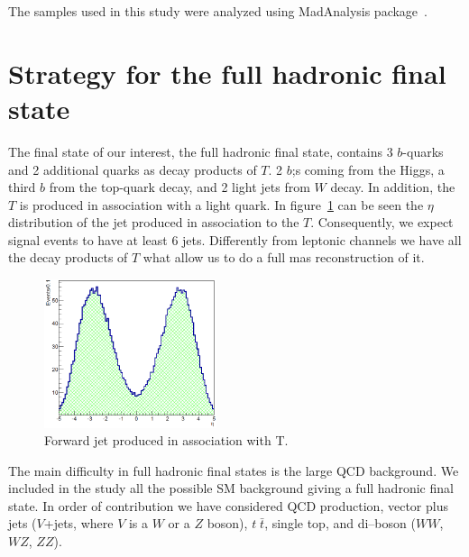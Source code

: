 The samples used in this study were analyzed using MadAnalysis package~\cite{Conte:2012fm, Conte:2014zja}.

\section{Strategy for the full hadronic final state}
\label{sec:Pstra}

The final state of our interest, the full hadronic final state, contains 3 $b$-quarks and 2 additional quarks as decay products of $T$. 2 $b$;s coming from the Higgs, a third $b$ from the top-quark decay, and 2 light jets from $W$ decay. In addition, the $T$ is produced in association with a light quark. In figure~\ref{fig:ForwJ} can be seen the $\eta$ distribution of the jet produced in association to the $T$. Consequently, we expect signal events to have at least 6 jets. Differently from leptonic channels we have all the decay products of $T$ what allow us to do a full mas reconstruction of it.

\begin{figure}[!Hhtbp]
  \begin{center}
    \includegraphics[width=0.45\textwidth]{figs/Pheno/SixthJet.png}
    \caption{Forward jet produced in association with T.}
    \label{fig:ForwJ}
  \end{center}
\end{figure}

The main difficulty in full hadronic final states is the large QCD background. We included in the study all the possible SM background giving a full hadronic final state. In order of contribution we have considered QCD production, vector plus jets ($V$+jets, where $V$ is a $W$ or a $Z$ boson), $t\; \bar{t}$, single top, and di--boson ($WW$, $WZ$, $ZZ$). 

